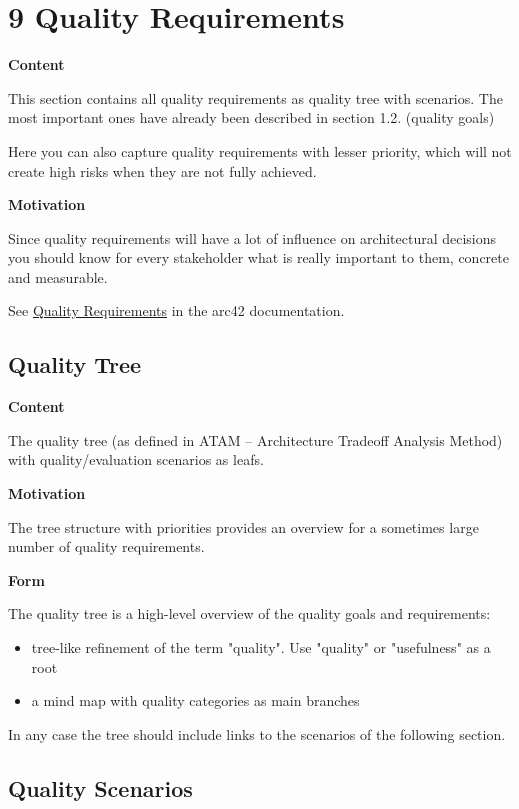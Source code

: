 \hypertarget{section-quality-scenarios}{%
\section{9 Quality Requirements}\label{section-quality-scenarios}}

\textbf{Content}

This section contains all quality requirements as quality tree with
scenarios. The most important ones have already been described in
section 1.2. (quality goals)

Here you can also capture quality requirements with lesser priority,
which will not create high risks when they are not fully achieved.

\textbf{Motivation}

Since quality requirements will have a lot of influence on architectural
decisions you should know for every stakeholder what is really important
to them, concrete and measurable.

See \href{https://docs.arc42.org/section-10/}{Quality Requirements} in
the arc42 documentation.

\hypertarget{_quality_tree}{%
\subsection{Quality Tree}\label{_quality_tree}}

\textbf{Content}

The quality tree (as defined in ATAM -- Architecture Tradeoff Analysis
Method) with quality/evaluation scenarios as leafs.

\textbf{Motivation}

The tree structure with priorities provides an overview for a sometimes
large number of quality requirements.

\textbf{Form}

The quality tree is a high-level overview of the quality goals and
requirements:

\begin{itemize}
\item
  tree-like refinement of the term "quality". Use "quality" or
  "usefulness" as a root
\item
  a mind map with quality categories as main branches
\end{itemize}

In any case the tree should include links to the scenarios of the
following section.

\hypertarget{_quality_scenarios}{%
\subsection{Quality Scenarios}\label{_quality_scenarios}}

